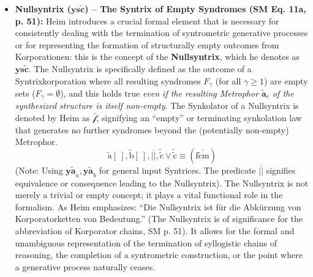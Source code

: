 \documentclass[12pt]{article}
\newcommand{\q}[1]{\enquote{#1}}
\newcommand{\syntrix}{\bm{y\widetilde{a}}}
\newcommand{\metrophor}{\bm{\widetilde{a}}}
\newcommand{\synkolator}{\mathcal{f}}
\newcommand{\syndrom}{F}
\newcommand{\nullsyntrix}{\bm{ys\widetilde{c}}}
\begin{document}
\begin{itemize}
    \item \textbf{Nullsyntrix (\( \nullsyntrix \)) – The Syntrix of Empty Syndromes (SM Eq. 11a, p. 51):}
    Heim introduces a crucial formal element that is necessary for consistently dealing with the termination of syntrometric generative processes or for representing the formation of structurally empty outcomes from Korporationen: this is the concept of the \textbf{Nullsyntrix}, which he denotes as \( \nullsyntrix \). The Nullsyntrix is specifically defined as the outcome of a Syntrixkorporation where all resulting syndromes \( \syndrom_\gamma \) (for all \( \gamma \geq 1 \)) are empty sets (\( \syndrom_\gamma = \emptyset \)), and this holds true \textit{even if the resulting Metrophor \( \metrophor_c \) of the synthesized structure is itself non-empty}. The Synkolator of a Nullsyntrix is denoted by Heim as \( \bar{\synkolator} \), signifying an \q{empty} or terminating synkolation law that generates no further syndromes beyond the (potentially non-empty) Metrophor.
    \begin{equation}
\tilde{\mathrm{a}}[\ ], \tilde{\mathrm{b}}[\ ], \overline{||}, \tilde{\tilde{\mathrm{c}}} \lor \tilde{\tilde{\mathrm{c}}} \equiv (\overline{\mathrm{f}\tilde{\mathrm{c}}\mathrm{m}})
\label{eq:original_nullsyntrix}
\end{equation}
    (Note: Using \( \syntrix_a, \syntrix_b \) for general input Syntrices. The predicate \( \overline{||} \) signifies equivalence or consequence leading to the Nullsyntrix). The Nullsyntrix is not merely a trivial or empty concept; it plays a vital functional role in the formalism. As Heim emphasizes: \q{Die Nullsyntrix ist für die Abkürzung von Korporatorketten von Bedeutung.} (The Nullsyntrix is of significance for the abbreviation of Korporator chains, SM p. 51). It allows for the formal and unambiguous representation of the termination of syllogistic chains of reasoning, the completion of a syntrometric construction, or the point where a generative process naturally ceases.


\end{itemize}
\end{document}
